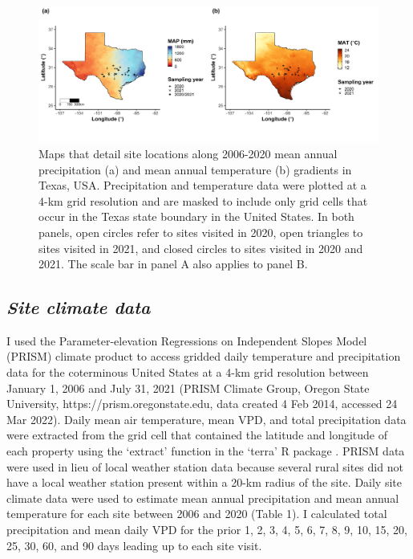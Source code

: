 \newpage
\begin{landscape}
    \begin{figure}
        \centering
        \includegraphics[scale = 0.049]{ch4_TXeco/figs/TXeco_fig1_site_map.png}
        \caption[Maps that detail site locations along 2006-2020 mean annual precipitation and mean annual temperature gradients in Texas, USA.]{Maps that detail site locations along 2006-2020 mean annual precipitation (a) and mean annual temperature (b) gradients in Texas, USA. Precipitation and temperature data were plotted at a 4-km grid resolution and are masked to include only grid cells that occur in the Texas state boundary in the United States. In both panels, open circles refer to sites visited in 2020, open triangles to sites visited in 2021, and closed circles to sites visited in 2020 and 2021. The scale bar in panel A also applies to panel B.}
        \label{fig:figure4.1}
    \end{figure}
\end{landscape}
\clearpage

\subsection{\textit{Site climate data}}
I used the Parameter-elevation Regressions on Independent Slopes Model (PRISM) climate product to access gridded daily temperature and precipitation data for the coterminous United States at a 4-km grid resolution between January 1, 2006 and July 31, 2021 (PRISM Climate Group, Oregon State University, https://prism.oregonstate.edu, data created 4 Feb 2014, accessed 24 Mar 2022). Daily mean air temperature, mean VPD, and total precipitation data were extracted from the grid cell that contained the latitude and longitude of each property using the ‘extract’ function in the ‘terra’ R package . PRISM data were used in lieu of local weather station data because several rural sites did not have a local weather station present within a 20-km radius of the site. Daily site climate data were used to estimate mean annual precipitation and mean annual temperature for each site between 2006 and 2020 (Table 1). I calculated total precipitation and mean daily VPD for the prior 1, 2, 3, 4, 5, 6, 7, 8, 9, 10, 15, 20, 25, 30, 60, and 90 days leading up to each site visit.


